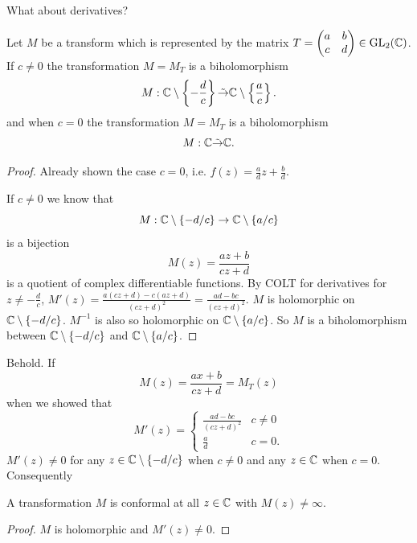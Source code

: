 \documentclass[10pt, a4paper]{article}
\begin{document}
What about derivatives?

\begin{lemma}
    Let $M$ be a \mobius transform which is represented by the matrix $T = \begin{pmatrix}
        a & b \\ c & d
    \end{pmatrix} \in \mathrm{GL}_2(\mathbb{C})$.
    If $c \neq 0$ the \mobius transformation $M = M_T$ is a biholomorphism
    \[
    M : \mathbb{C} \setminus \left\{-\frac{d}{c}\right\} \tilde{\to} \mathbb{C} \setminus \left\{\frac{a}{c}\right\}.
    \]
    and when $c = 0$ the \mobius transformation $M = M_T$ is a biholomorphism
    \[
    M : \mathbb{C} \tilde{\to} \mathbb{C}.
    \]

    \begin{proof}
        Already shown the case $c = 0$,
        i.e. $f(z) = \frac{a}{d}z + \frac{b}{d}$.

        If $c \neq 0$ we know that
        \[
        M : \mathbb{C} \setminus \{-d / c\} \to \mathbb{C} \setminus \{a / c\}
        \]
        is a bijection
        \[
        M(z) = \frac{az + b}{cz + d}
        \]
        is a quotient of complex differentiable functions.
        By COLT for derivatives for $z \neq -\frac{d}{c}$,
        $M'(z) = \frac{a(cz + d) - c(az + d)}{(cz + d) ^ 2} = \frac{ad - bc}{(cz + d) ^ 2}$.
        $M$ is holomorphic on $\mathbb{C} \setminus \{-d / c\}$.
        $M ^ {-1}$ is also \mobius so holomorphic on $\mathbb{C} \setminus \{a / c\}$.
        So $M$ is a biholomorphism between $\mathbb{C} \setminus \{-d / c\}$ and $\mathbb{C} \setminus \{a / c\}$.
    \end{proof}
\end{lemma}

Behold.
If
\[
M(z) = \frac{ax + b}{cz + d} = M_T(z)
\]
when we showed that
\[
M'(z) = \begin{cases}
    \frac{ad - bc}{(cz + d) ^ 2} & c \neq 0 \\
    \frac{a}{d} & c = 0.
\end{cases}
\]
$M'(z) \neq 0$ for any $z \in \mathbb{C} \setminus \{-d / c\}$ when $c \neq 0$ and any $z \in \mathbb{C}$ when $c = 0$.
Consequently

\begin{corollary}
    A \mobius transformation $M$ is conformal at all $z \in \mathbb{C}$ with $M(z) \neq \infty$.

    \begin{proof}
        $M$ is holomorphic and $M'(z) \neq 0$.
    \end{proof}
\end{corollary}
\end{document}
